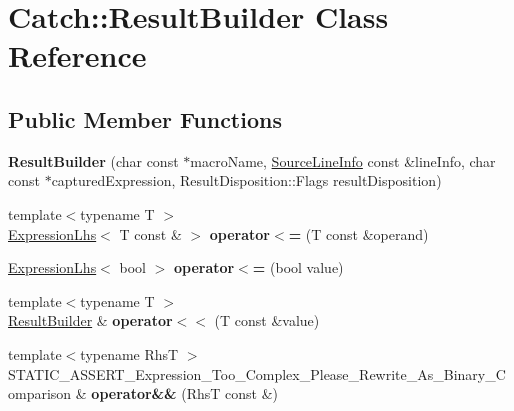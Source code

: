 \hypertarget{class_catch_1_1_result_builder}{}\section{Catch\+:\+:Result\+Builder Class Reference}
\label{class_catch_1_1_result_builder}
\subsection*{Public Member Functions}
\begin{DoxyCompactItemize}
\item 
\mbox{\label{class_catch_1_1_result_builder_a18c2929702bdde1f835e39717a0e554b}} 
{\bfseries Result\+Builder} (char const $\ast$macro\+Name, \hyperlink{struct_catch_1_1_source_line_info}{Source\+Line\+Info} const \&line\+Info, char const $\ast$captured\+Expression, Result\+Disposition\+::\+Flags result\+Disposition)
\item 
\mbox{\label{class_catch_1_1_result_builder_ad76939f5a52fcb534f97b49a0b7bc560}} 
{\footnotesize template$<$typename T $>$ }\\\hyperlink{class_catch_1_1_expression_lhs}{Expression\+Lhs}$<$ T const  \& $>$ {\bfseries operator$<$=} (T const \&operand)
\item 
\mbox{\label{class_catch_1_1_result_builder_a3b87b20bcd1ef9e630880e59eeefba2a}} 
\hyperlink{class_catch_1_1_expression_lhs}{Expression\+Lhs}$<$ bool $>$ {\bfseries operator$<$=} (bool value)
\item 
\mbox{\label{class_catch_1_1_result_builder_a5aa79ce6160ab8cd800eb65bbd7a28a4}} 
{\footnotesize template$<$typename T $>$ }\\\hyperlink{class_catch_1_1_result_builder}{Result\+Builder} \& {\bfseries operator$<$$<$} (T const \&value)
\item 
\mbox{\label{class_catch_1_1_result_builder_ae92c6badf3f8e2ad4df66701a285f996}} 
{\footnotesize template$<$typename RhsT $>$ }\\S\+T\+A\+T\+I\+C\+\_\+\+A\+S\+S\+E\+R\+T\+\_\+\+Expression\+\_\+\+Too\+\_\+\+Complex\+\_\+\+Please\+\_\+\+Rewrite\+\_\+\+As\+\_\+\+Binary\+\_\+\+Comparison \& {\bfseries operator\&\&} (RhsT const \&)

\end{DoxyCompactItemize}
